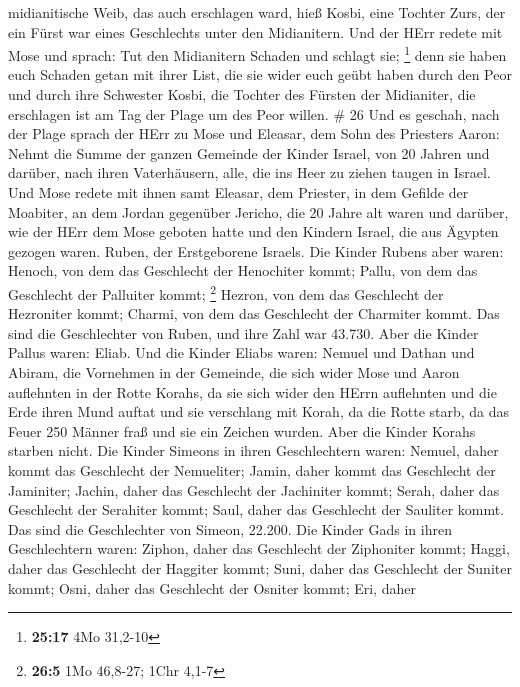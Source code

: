 midianitische Weib, das auch erschlagen ward, hieß Kosbi, eine Tochter
Zurs, der ein Fürst war eines Geschlechts unter den Midianitern.
 Und der HErr redete mit Mose und sprach:  Tut
den Midianitern Schaden und schlagt sie; \footnote{\textbf{25:17} 4Mo
  31,2-10}  denn sie haben euch Schaden getan mit ihrer
List, die sie wider euch geübt haben durch den Peor und durch ihre
Schwester Kosbi, die Tochter des Fürsten der Midianiter, die erschlagen
ist am Tag der Plage um des Peor willen. \# 26  Und es
geschah, nach der Plage sprach der HErr zu Mose und Eleasar, dem Sohn
des Priesters Aaron:  Nehmt die Summe der ganzen Gemeinde
der Kinder Israel, von 20 Jahren und darüber, nach ihren Vaterhäusern,
alle, die ins Heer zu ziehen taugen in Israel.  Und Mose
redete mit ihnen samt Eleasar, dem Priester, in dem Gefilde der
Moabiter, an dem Jordan gegenüber Jericho,  die 20 Jahre alt
waren und darüber, wie der HErr dem Mose geboten hatte und den Kindern
Israel, die aus Ägypten gezogen waren.  Ruben, der
Erstgeborene Israels. Die Kinder Rubens aber waren: Henoch, von dem das
Geschlecht der Henochiter kommt; Pallu, von dem das Geschlecht der
Palluiter kommt; \footnote{\textbf{26:5} 1Mo 46,8-27; 1Chr 4,1-7}
 Hezron, von dem das Geschlecht der Hezroniter kommt;
Charmi, von dem das Geschlecht der Charmiter kommt.  Das
sind die Geschlechter von Ruben, und ihre Zahl war 43.730. 
Aber die Kinder Pallus waren: Eliab.  Und die Kinder Eliabs
waren: Nemuel und Dathan und Abiram, die Vornehmen in der Gemeinde, die
sich wider Mose und Aaron auflehnten in der Rotte Korahs, da sie sich
wider den HErrn auflehnten  und die Erde ihren Mund auftat
und sie verschlang mit Korah, da die Rotte starb, da das Feuer 250
Männer fraß und sie ein Zeichen wurden.  Aber die Kinder
Korahs starben nicht.  Die Kinder Simeons in ihren
Geschlechtern waren: Nemuel, daher kommt das Geschlecht der Nemueliter;
Jamin, daher kommt das Geschlecht der Jaminiter; Jachin, daher das
Geschlecht der Jachiniter kommt;  Serah, daher das
Geschlecht der Serahiter kommt; Saul, daher das Geschlecht der Sauliter
kommt.  Das sind die Geschlechter von Simeon, 22.200.
 Die Kinder Gads in ihren Geschlechtern waren: Ziphon,
daher das Geschlecht der Ziphoniter kommt; Haggi, daher das Geschlecht
der Haggiter kommt; Suni, daher das Geschlecht der Suniter kommt;
 Osni, daher das Geschlecht der Osniter kommt; Eri, daher
